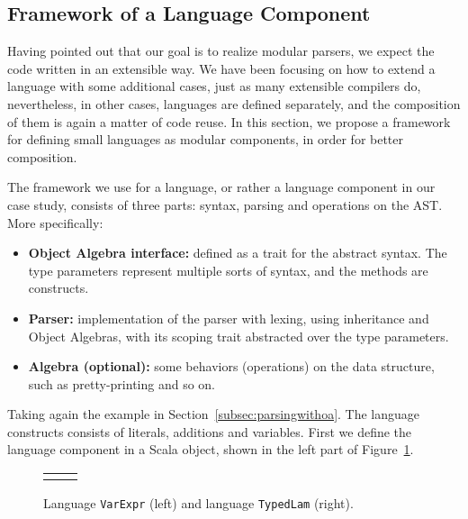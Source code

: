 
\subsection{Framework of a Language Component}\label{subsec:framework}

Having pointed out that our goal is to realize modular parsers, we expect the code written in an extensible way. We have been focusing on how to extend a language with some additional cases, just as many extensible compilers do, nevertheless, in other cases, languages are defined separately, and the composition of them is again a matter of code reuse. In this section, we propose a framework for defining small languages as modular components, in order for better composition.

The framework we use for a language, or rather a language component in our case study, consists of three parts: syntax, parsing and operations on the AST. More
specifically:
\begin{itemize}
    \item \textbf{Object Algebra interface:} defined as a trait for the abstract syntax. The type parameters represent multiple sorts of syntax, and the methods are constructs.
\item \textbf{Parser:} implementation of the parser with lexing, using inheritance and Object Algebras, with its scoping trait abstracted over the type parameters.
\item \textbf{Algebra (optional):} some behaviors (operations) on the data structure, such as pretty-printing and so on.
\end{itemize}

Taking again the example in Section~\ref{subsec:parsingwithoa}. The language constructs consists of literals, additions and variables. First we define the
language component in a Scala object, shown in the left part of Figure~\ref{fig:lng-components}.

\begin{figure}[t]
\begin{tabular}{m{0.42\linewidth}m{0.52\linewidth}}
&
\end{tabular}
\caption{Language \lstinline{VarExpr} (left) and language \lstinline{TypedLam} (right).}\label{fig:lng-components}
\end{figure}

